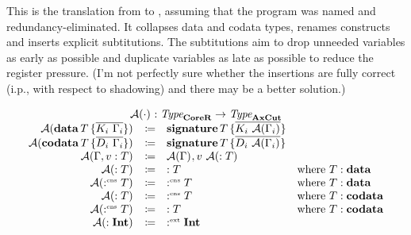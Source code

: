 This is the translation from \targetlang{} to \machinelang, assuming that the program was named and redundancy-eliminated.
It collapses data and codata types, renames constructs and inserts explicit subtitutions.
The subtitutions aim to drop unneeded variables as early as possible and duplicate variables as late as possible to reduce the register pressure.
(I'm not perfectly sure whether the insertions are fully correct (i.p., with respect to shadowing) and there may be a better solution.)

\[
  \begin{array}{rcll}
    \multicolumn{4}{c}{\axcutify{\cdot}{} : \emph{Type}_{\targetred{}} \rightarrow \emph{Type}_{\machinelang{}}}\\
    \axcutify{\data{T}{\overline{K_i\ \Gamma_i}}}{} & \coloneq & \sig{T}{\overline{K_i\ \axcutify{\Gamma_i}{}}} & \\
    \axcutify{\codata{T}{\overline{D_i\ \Gamma_i}}}{} & \coloneq & \sig{T}{\overline{D_i\ \axcutify{\Gamma_i}{}}} & \\
    \axcutify{\Gamma, v : T}{} & \coloneq & \axcutify{\Gamma}{}, v\ \axcutify{: T}{} & \\
    \axcutify{: T}{} & \coloneq & : T & \text{where } T : \mathbf{data} \\
    \axcutify{\cnt T}{} & \coloneq & \cnt T & \text{where } T : \mathbf{data} \\
    \axcutify{: T}{} & \coloneq & \cnt T & \text{where } T : \mathbf{codata} \\
    \axcutify{\cnt T}{} & \coloneq & : T & \text{where } T : \mathbf{codata} \\
    \axcutify{: \tyint}{} & \coloneq & \ext \tyint & \\
  \end{array}
\]


